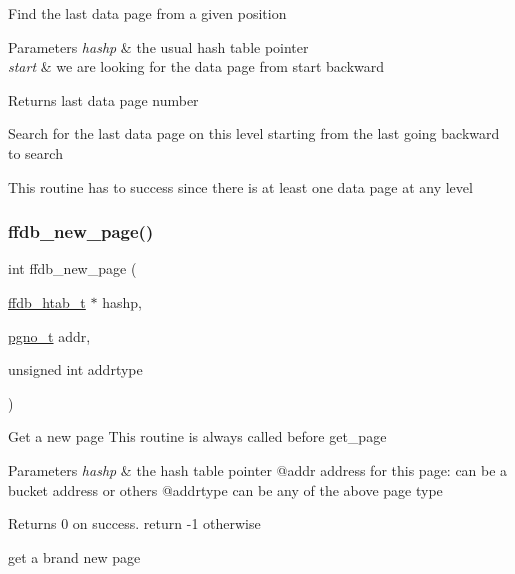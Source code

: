 Find the last data page from a given position


\begin{DoxyParams}{Parameters}
{\em hashp} & the usual hash table pointer \\
\hline
{\em start} & we are looking for the data page from start backward\\
\hline
\end{DoxyParams}
\begin{DoxyReturn}{Returns}
last data page number
\end{DoxyReturn}
Search for the last data page on this level starting from the last going backward to search

This routine has to success since there is at least one data page at any level \mbox{\label{adat-devel_2other__libs_2filedb_2filehash_2ffdb__hash_8h_a3781c690210dc9ff030bca63ca76b521}} 
\subsubsection{\texorpdfstring{ffdb\_new\_page()}{ffdb\_new\_page()}}
{\footnotesize\ttfamily int ffdb\+\_\+new\+\_\+page (\begin{DoxyParamCaption}\item[{\mbox{\hyperlink{adat-devel_2other__libs_2filedb_2filehash_2ffdb__hash_8h_ae592010ed2bedc975d3cc0b7d074b9d1}{ffdb\+\_\+htab\+\_\+t}} $\ast$}]{hashp,  }\item[{\mbox{\hyperlink{adat-devel_2other__libs_2filedb_2filehash_2ffdb__db_8h_a000813331643d38481142bcce7de1501}{pgno\+\_\+t}}}]{addr,  }\item[{unsigned int}]{addrtype }\end{DoxyParamCaption})}

Get a new page This routine is always called before get\+\_\+page


\begin{DoxyParams}{Parameters}
{\em hashp} & the hash table pointer @addr address for this page\+: can be a bucket address or others @addrtype can be any of the above page type\\
\hline
\end{DoxyParams}
\begin{DoxyReturn}{Returns}
0 on success. return -\/1 otherwise
\end{DoxyReturn}
get a brand new page \mbox{\label{adat-devel_2other__libs_2filedb_2filehash_2ffdb__hash_8h_aee8d402020a44a72f40cff30ae2f9bd9}} 
